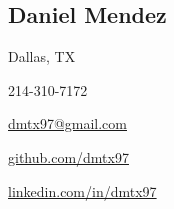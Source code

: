 
\def \locationIcon {\faMapMarker*}
\def \locationText {Dallas, TX}
\def \location {\locationIcon \hspace{5pt}\locationText}

\def \phoneIcon {\faPhone*}
\def \phoneText {214-310-7172}
\def \phone {\phoneIcon \hspace{5pt}\phoneText}

\def \emailIcon {\faEnvelope}
\def \emailText {dmtx97@gmail.com}
\def \emailLink {mailto:dmtx97@gmail.com}
\def \email {\emailIcon \hspace{5pt}\href{\emailLink}{\emailText}}

\def \githubIcon {\faGithub}
\def \githubText {github.com/dmtx97}
\def \githubLink {https://github.com/dmtx97}
\def \github {\githubIcon \hspace{5pt}\href{\githubLink}{\githubText}}

\def \linkedinIcon {\faLinkedin}
\def \linkedinLink {https://www.linkedin.com/in/dmtx97/}
\def \linkedinText {linkedin.com/in/dmtx97}
\def \linkedin {\linkedinIcon \hspace{5pt}\href{\linkedinLink}{\linkedinText}}

\def \name {Daniel Mendez}

\begin{center}
	\section*{\huge{\name}}

	\begin{headerlinks}
		\item \location
		\item \phone
		\item \email
		\item \github
		\item \linkedin
	\end{headerlinks}
\end{center}


